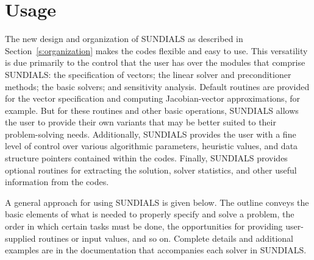 \section{Usage} 
\label{s:usage}

The new design and organization of SUNDIALS 
as described in Section~\ref{s:organization}
makes the codes flexible and easy to use.
This versatility is due primarily to the control that the user has
over the modules that comprise SUNDIALS: the specification of vectors;
the linear solver and preconditioner methods; the basic solvers; and
sensitivity analysis.
Default routines are provided for the vector specification and
computing Jacobian-vector approximations, for example. But for these
routines and other basic operations, SUNDIALS allows the user to provide
their own variants that may be better suited to their problem-solving
needs. 
Additionally, SUNDIALS provides the user with a fine level of control
over various algorithmic parameters, heuristic values, and data
structure pointers contained within the codes.
Finally, SUNDIALS provides optional routines for extracting the
solution, solver statistics, and other useful information from the codes.

A general approach for using SUNDIALS is given below. 
The outline conveys the basic elements of what is needed to properly
specify and solve a problem, the order in which certain tasks must be
done, the opportunities for providing user-supplied
routines or input values, and so on.
Complete details and additional examples are in the documentation that
accompanies each solver in SUNDIALS.

